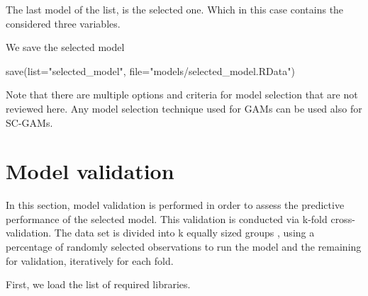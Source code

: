 \documentclass[
]{book}
\newenvironment{Shaded}{\begin{snugshade}}{\end{snugshade}}
\newcommand{\AttributeTok}[1]{\textcolor[rgb]{0.77,0.63,0.00}{#1}}
\newcommand{\FunctionTok}[1]{\textcolor[rgb]{0.00,0.00,0.00}{#1}}
\newcommand{\NormalTok}[1]{#1}
\newcommand{\OtherTok}[1]{\textcolor[rgb]{0.56,0.35,0.01}{#1}}
\newcommand{\SpecialCharTok}[1]{\textcolor[rgb]{0.00,0.00,0.00}{#1}}
\newcommand{\StringTok}[1]{\textcolor[rgb]{0.31,0.60,0.02}{#1}}
\begin{document}
The last model of the list, is the selected one. Which in this case contains the considered three variables.

\begin{Shaded}
\end{Shaded}

We save the selected model

\begin{Shaded}
\begin{Highlighting}[]
\FunctionTok{save}\NormalTok{(}\AttributeTok{list=}\StringTok{"selected\_model"}\NormalTok{, }\AttributeTok{file=}\StringTok{"models/selected\_model.RData"}\NormalTok{)}
\end{Highlighting}
\end{Shaded}

Note that there are multiple options and criteria for model selection that are not reviewed here. Any model selection technique used for GAMs can be used also for SC-GAMs.

\hypertarget{model-validation}{%
\chapter{Model validation}\label{model-validation}}

In this section, model validation is performed in order to assess the predictive performance of the selected model. This validation is conducted via k-fold cross-validation. The data set is divided into k equally sized groups \citep{hijmans_2012}, using a percentage of randomly selected observations to run the model and the remaining for validation, iteratively for each fold.

First, we load the list of required libraries.
\end{document}

